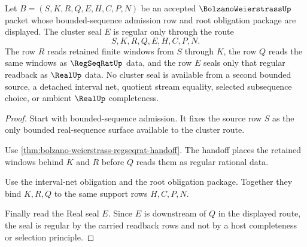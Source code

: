 \begin{theorem}
\label{thm:bolzano-weierstrass-regular-cluster-seal}
Let $B=(S,K,R,Q,E,H,C,P,N)$ be an accepted $\BolzanoWeierstrassUp$ packet whose bounded-sequence admission row and root obligation package are displayed. The cluster seal $E$ is regular only through the route
$$
S,K,R,Q,E,H,C,P,N .
$$
The row $R$ reads retained finite windows from $S$ through $K$, the row $Q$ reads the same windows as $\RegSeqRatUp$ data, and the row $E$ seals only that regular readback as $\RealUp$ data. No cluster seal is available from a second bounded source, a detached interval net, quotient stream equality, selected subsequence choice, or ambient $\RealUp$ completeness.
\end{theorem}
\begin{proof}
Start with bounded-sequence admission. It fixes the source row $S$ as the only bounded real-sequence surface available to the cluster route.

Use \autoref{thm:bolzano-weierstrass-regseqrat-handoff}. The handoff places the retained windows behind $K$ and $R$ before $Q$ reads them as regular rational data.

Use the interval-net obligation and the root obligation package. Together they bind $K,R,Q$ to the same support rows $H,C,P,N$.

Finally read the Real seal $E$. Since $E$ is downstream of $Q$ in the displayed route, the seal is regular by the carried readback rows and not by a host completeness or selection principle.
\end{proof}

